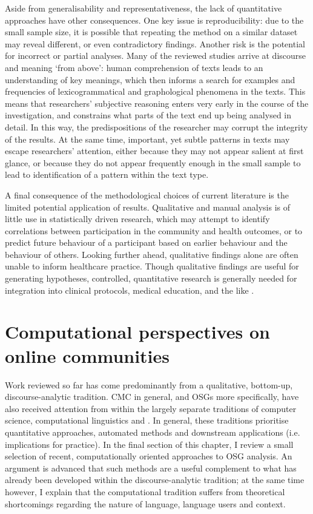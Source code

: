 Aside from generalisability and representativeness, the lack of quantitative approaches have other consequences. One key issue is reproducibility: due to the small sample size, it is possible that repeating the method on a similar dataset may reveal different, or even contradictory findings. Another risk is the potential for incorrect or partial analyses. Many of the reviewed studies arrive at discourse and meaning `from above': human comprehension of texts leads to an understanding of key meanings, which then informs a search for examples and frequencies of lexicogrammatical and graphological phenomena in the texts. This means that researchers' subjective reasoning enters very early in the course of the investigation, and constrains what parts of the text end up being analysed in detail. In this way, the predispositions of the researcher may corrupt the integrity of the results. At the same time, important, yet subtle patterns in texts may escape researchers' attention, either because they may not appear salient at first glance, or because they do not appear frequently enough in the small sample to lead to identification of a pattern within the text type.

A final consequence of the methodological choices of current literature is the limited potential application of results. Qualitative and manual analysis is of little use in statistically driven research, which may attempt to identify correlations between participation in the community and health outcomes, or to predict future behaviour of a participant based on earlier behaviour and the behaviour of others. Looking further ahead, qualitative findings alone are often unable to inform healthcare practice. Though qualitative findings are useful for generating hypotheses, controlled, quantitative research is generally needed for integration into clinical protocols, medical education, and the like \cite{giacomini2000users}.

\section{Computational perspectives on online communities}

Work reviewed so far has come predominantly from a qualitative, bottom\hyp{}up, discourse\hyp{}analytic tradition. \gls{CMC} in general, and \glspl{OSG} more specifically, have also received attention from within the largely separate traditions of computer science, computational linguistics and . In general, these traditions prioritise quantitative approaches, automated methods and downstream applications (i.e. implications for practice). In the final section of this chapter, I review a small selection of recent, computationally oriented approaches to \gls{OSG} analysis. An argument is advanced that such methods are a useful complement to what has already been developed within the discourse\hyp{}analytic tradition; at the same time however, I explain that the computational tradition suffers from theoretical shortcomings regarding the nature of language, language users and context.

